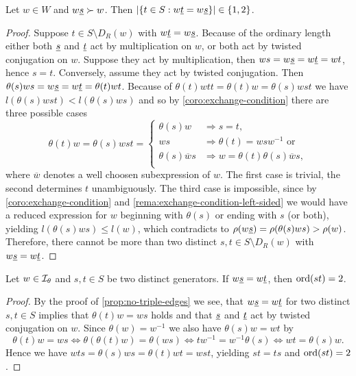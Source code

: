 \begin{prop}
	Let $w \in W$ and $w \underline{s} \succ w$. Then $|\{ t \in S : w \underline{t} = w \underline{s} \}| \in \{1,2\}$.

	\begin{proof}
		Suppose $t \in S \setminus D_R(w)$ with $w \underline{t} = w \underline{s}$. Because of the ordinary length either both $\underline{s}$ and $\underline{t}$ act by multiplication on $w$, or both act by twisted conjugation on $w$. Suppose they act by multiplication, then $ws = w \underline{s} = w \underline{t} = wt$, hence $s = t$. Conversely, assume they act by twisted conjugation. Then $\theta(s) w s = w \underline{s} = w \underline{t} = \theta(t)wt$. Because of $\theta(t) w t t = \theta(t) w = \theta(s) w s t$ we have $l(\theta(s) w s t) < l(\theta(s) w s)$ and so by \ref{coro:exchange-condition} there are three possible cases
		$$ \theta(t)w = \theta(s) w s t = \begin{cases}
			\theta(s) w & \Rightarrow s = t, \\
			w s & \Rightarrow \theta(t) = w s w^{-1} \textrm{ or} \\
			\theta(s) \overline w s & \Rightarrow w = \theta(t) \theta(s) \overline w s, \\
		\end{cases} $$
		where $\overline w$ denotes a well choosen subexpression of $w$. The first case is trivial, the second determines $t$ unambiguously. The third case is impossible, since by \ref{coro:exchange-condition} and \ref{rema:exchange-condition-left-sided} we would have a reduced expression for $w$ beginning with $\theta(s)$ or ending with $s$ (or both), yielding $l(\theta(s)ws) \leq l(w)$, which contradicts to $\rho(w \underline{s}) = \rho(\theta(s)ws) > \rho(w)$. Therefore, there cannot be more than two distinct $s,t \in S \setminus D_R(w)$ with $w \underline{s} = w \underline{t}$.
	\end{proof}
\end{prop}

\begin{coro}
	Let $w \in \mathcal{I}_{\theta}$ and $s,t \in S$ be two distinct generators. If $w \underline{s} = w \underline{t}$, then $\operatorname{ord}(st) = 2$.

	\begin{proof}
		By the proof of \ref{prop:no-triple-edges} we see, that $w \underline{s} = w \underline{t}$ for two distinct $s,t \in S$ implies that $\theta(t)w = ws$ holds and that $\underline{s}$ and $\underline{t}$ act by twisted conjugation on $w$. Since $\theta(w) = w^{-1}$ we also have $\theta(s)w = wt$ by
		$$ \theta(t)w = ws \iff \theta(\theta(t)w) = \theta(ws) \iff tw^{-1} = w^{-1} \theta(s) \iff wt = \theta(s)w. $$
		Hence we have $wts = \theta(s)ws = \theta(t)wt = wst$, yielding $st = ts$ and $\operatorname{ord}(st) = 2$.
	\end{proof}
\end{coro}
